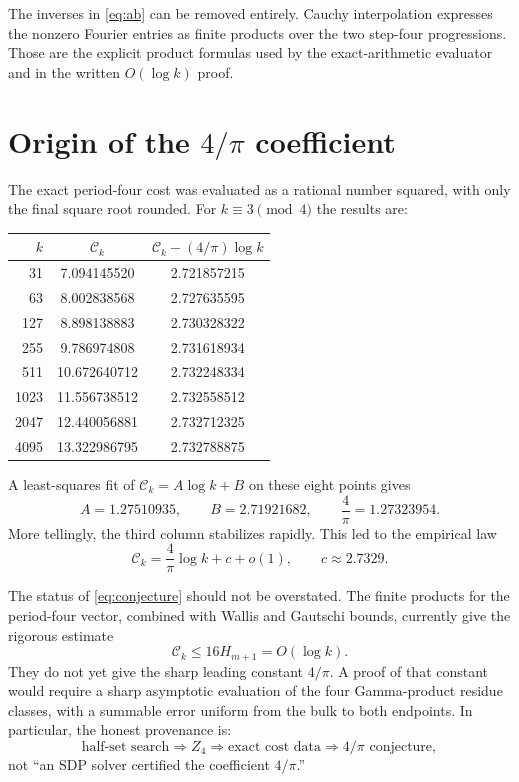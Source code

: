\documentclass[11pt]{article}
\newcommand{\1}{\mathbf 1}
\begin{document}
The inverses in \eqref{eq:ab} can be removed entirely.  Cauchy interpolation
expresses the nonzero Fourier entries as finite products over the two
step-four progressions.  Those are the explicit product formulas used by the
exact-arithmetic evaluator and in the written $O(\log k)$ proof.

\section{Origin of the $4/\pi$ coefficient}

The exact period-four cost was evaluated as a rational number squared, with
only the final square root rounded.  For $k\equiv3\pmod4$ the results are:
\begin{center}
\begin{tabular}{rcc}
\toprule
$k$&$\mathcal C_k$&$\mathcal C_k-(4/\pi)\log k$\\
\midrule
31   & 7.094145520 & 2.721857215\\
63   & 8.002838568 & 2.727635595\\
127  & 8.898138883 & 2.730328322\\
255  & 9.786974808 & 2.731618934\\
511  &10.672640712 & 2.732248334\\
1023 &11.556738512 & 2.732558512\\
2047 &12.440056881 & 2.732712325\\
4095 &13.322986795 & 2.732788875\\
\bottomrule
\end{tabular}
\end{center}
A least-squares fit of $\mathcal C_k=A\log k+B$ on these eight points gives
\begin{equation}
 A=1.27510935,\qquad B=2.71921682,\qquad
 \frac4\pi=1.27323954.                                  \label{eq:fit}
\end{equation}
More tellingly, the third column stabilizes rapidly.  This led to the
empirical law
\begin{equation}
 \boxed{\mathcal C_k=\frac4\pi\log k+c+o(1),
 \qquad c\approx2.7329.}                                \label{eq:conjecture}
\end{equation}

The status of \eqref{eq:conjecture} should not be overstated.  The finite
products for the period-four vector, combined with Wallis and Gautschi
bounds, currently give the rigorous estimate
\begin{equation}
 \mathcal C_k\le16H_{m+1}=O(\log k).                    \label{eq:proved}
\end{equation}
They do not yet give the sharp leading constant $4/\pi$.  A proof of that
constant would require a sharp asymptotic evaluation of the four
Gamma-product residue classes, with a summable error uniform from the bulk
to both endpoints.  In particular, the honest provenance is:
\[
 \text{half-set search}\Rightarrow Z_4
 \Rightarrow \text{exact cost data}\Rightarrow 4/\pi\text{ conjecture},
\]
not ``an SDP solver certified the coefficient $4/\pi$.''
\end{document}
